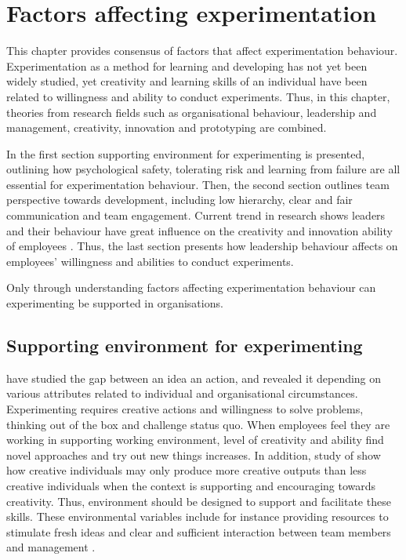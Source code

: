 \chapter{Factors affecting experimentation} \label{faetheory}
This chapter provides consensus of factors that affect experimentation behaviour.  Experimentation as a method for learning and developing has not yet been widely studied, yet creativity and learning skills of an individual have been related to willingness and ability to conduct experiments. Thus, in this chapter, theories from research fields such as organisational behaviour, leadership and management, creativity, innovation and prototyping are combined. 

In the first section supporting environment for experimenting is presented, outlining how psychological safety, tolerating risk and learning from failure are all essential for experimentation behaviour. Then, the second section outlines team perspective towards development, including low hierarchy, clear and fair communication and team engagement. Current trend in research shows leaders and their behaviour have great influence on the creativity and innovation ability of employees \citep{mumford2002leading,jung2001transformational,amabile1998kill}. Thus, the last section presents how leadership behaviour affects on employees' willingness and abilities to conduct experiments.

Only through understanding factors affecting experimentation behaviour can experimenting be supported in organisations. 

\section{Supporting environment for experimenting}
\citet{mumford1988creativity} have studied the gap between an idea an action, and revealed it depending on various attributes related to individual and organisational circumstances. Experimenting requires creative actions and willingness to solve problems, thinking out of the box and challenge status quo. When employees feel they are working in supporting working environment, level of creativity and ability find novel approaches and try out new things increases. \citep{shalley2004leaders} In addition, study of \citet{oldham1996employee} show how creative individuals may only produce more creative outputs than less creative individuals when the context is supporting and encouraging towards creativity. Thus, environment should be designed to support and facilitate these skills. These environmental variables include for instance providing resources to stimulate fresh ideas and clear and sufficient interaction between team members and management \citep{mumford1988creativity,shalley2004leaders}. 

